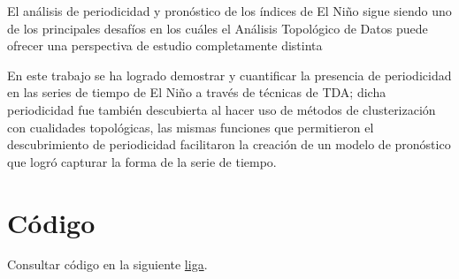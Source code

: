 \documentclass{article}
\begin{document}
        El análisis de periodicidad y pronóstico de los índices de El Niño sigue siendo uno de los principales desafíos en los cuáles el Análisis Topológico de Datos puede ofrecer una perspectiva de estudio completamente distinta

        En este trabajo se ha logrado demostrar y cuantificar la presencia de periodicidad en las series de tiempo de El Niño a través de técnicas de TDA; dicha periodicidad fue también descubierta al hacer uso de métodos de clusterización con cualidades topológicas, las mismas funciones que permitieron el descubrimiento de periodicidad facilitaron la creación de un modelo de pronóstico que logró capturar la forma de la serie de tiempo.

    \clearpage
    
    

    \clearpage
    \appendix
    \section{Código}

        Consultar código en la siguiente \href{https://github.com/JuanEcheagaray75/elnino_tda}{liga}.
\end{document}
